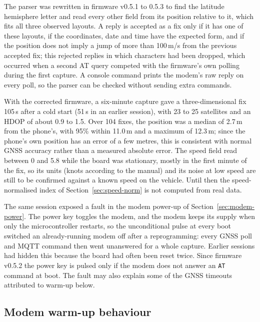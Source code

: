 The parser was rewritten in firmware v0.5.1 to 0.5.3 to find the latitude hemisphere letter and read every other field from its position relative to it, which fits all three observed layouts. A reply is accepted as a fix only if it has one of these layouts, if the coordinates, date and time have the expected form, and if the position does not imply a jump of more than 100\,m/s from the previous accepted fix; this rejected replies in which characters had been dropped, which occurred when a second AT query competed with the firmware's own polling during the first capture. A console command prints the modem's raw reply on every poll, so the parser can be checked without sending extra commands.

With the corrected firmware, a six-minute capture gave a three-dimensional fix 105\,s after a cold start (51\,s in an earlier session), with 23 to 25 satellites and an HDOP of about 0.9 to 1.5. Over 104 fixes, the position was a median of 2.7\,m from the phone's, with 95\% within 11.0\,m and a maximum of 12.3\,m; since the phone's own position has an error of a few metres, this is consistent with normal GNSS accuracy rather than a measured absolute error. The speed field read between 0 and 5.8 while the board was stationary, mostly in the first minute of the fix, so its units (knots according to the manual) and its noise at low speed are still to be confirmed against a known speed on the vehicle. Until then the speed-normalised index of Section~\ref{sec:speed-norm} is not computed from real data.

The same session exposed a fault in the modem power-up of Section~\ref{sec:modem-power}. The power key toggles the modem, and the modem keeps its supply when only the microcontroller restarts, so the unconditional pulse at every boot switched an already-running modem off after a reprogramming: every GNSS poll and MQTT command then went unanswered for a whole capture. Earlier sessions had hidden this because the board had often been reset twice. Since firmware v0.5.2 the power key is pulsed only if the modem does not answer an \texttt{AT} command at boot. The fault may also explain some of the GNSS timeouts attributed to warm-up below.

\subsection{Modem warm-up behaviour}

